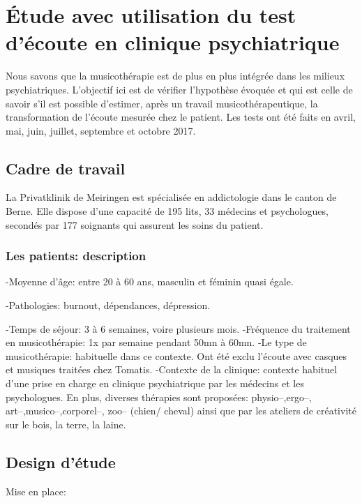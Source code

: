 \chapter[\'Etude en clinique]{\'Etude avec utilisation du test
  d'écoute en clinique psychiatrique}

Nous savons que la musicothérapie est de plus en plus intégrée dans
les milieux psychiatriques.
L'objectif ici est de vérifier l'hypothèse évoquée et qui est celle de savoir s'il est possible d'estimer, après un travail 
musicothérapeutique, la transformation de l'écoute mesurée chez le
patient.
Les tests ont été faits en avril, mai, juin, juillet, septembre et octobre 2017.

\section{Cadre de travail}

 La Privatklinik
de Meiringen est  spécialisée en
addictologie dans le canton de Berne. Elle dispose d'une capacité de 195 lits, 33 médecins et
psychologues, secondés par 177 soignants qui assurent les soins du
patient.




\subsection{Les patients: description}


-Moyenne d'âge:  entre 20 à 60 ans, masculin et féminin quasi égale.


-Pathologies:  burnout, dépendances, dépression.

-Temps de séjour: 3 à 6 semaines, voire plusieurs mois.
-Fréquence du traitement en musicothérapie: 1x par semaine pendant
50mn à 60mn.
-Le type de musicothérapie: habituelle dans ce contexte.
Ont été  exclu l'écoute avec casques et  musiques traitées chez Tomatis.
-Contexte de la clinique: contexte habituel d'une prise en
charge en clinique psychiatrique 
par les médecins et  les psychologues.
En plus, diverses thérapies sont proposées: physio--,ergo--,
art--,musico--,corporel--, zoo--  (chien/ cheval)  ainsi
que par les  ateliers de créativité sur le bois, la terre, la laine.  


\section{Design d'étude}

Mise en place:

